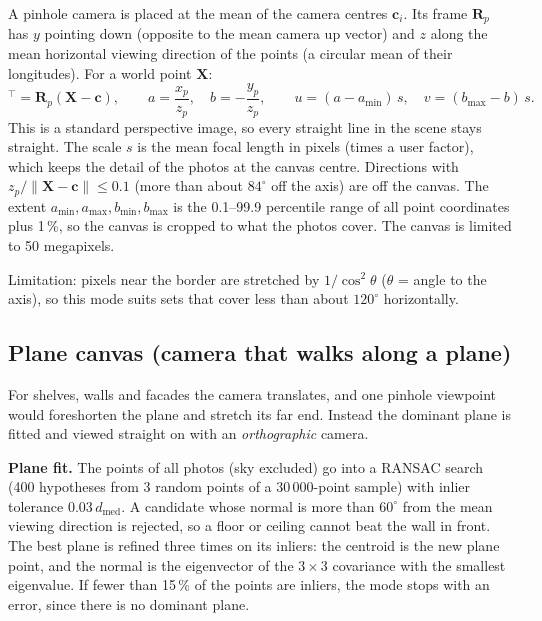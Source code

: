 \documentclass[11pt, a4paper]{article}
\newcommand{\R}{\mathbf{R}}
\newcommand{\X}{\mathbf{X}}
\newcommand{\bc}{\mathbf{c}}
\begin{document}
A pinhole camera is placed at the mean of the camera centres $\bc_i$. Its frame $\R_p$ has $y$ pointing down
(opposite to the mean camera up vector) and $z$ along the mean horizontal viewing direction of the points
(a circular mean of their longitudes). For a world point $\X$:
\begin{equation}
  [x_p, y_p, z_p]^{\top} = \R_p (\X - \bc),
  \qquad a = \frac{x_p}{z_p}, \quad b = -\frac{y_p}{z_p},
  \qquad u = (a - a_{\min})\,s, \quad v = (b_{\max} - b)\,s .
\end{equation}
This is a standard perspective image, so every straight line in the scene stays straight. The scale $s$ is the
mean focal length in pixels (times a user factor), which keeps the detail of the photos at the canvas centre.
Directions with $z_p/\|\X - \bc\| \le 0.1$ (more than about $84^\circ$ off the axis) are off the canvas.
The extent $a_{\min}, a_{\max}, b_{\min}, b_{\max}$ is the 0.1--99.9 percentile range of all point coordinates plus 1\,\%,
so the canvas is cropped to what the photos cover. The canvas is limited to 50 megapixels.

Limitation: pixels near the border are stretched by $1/\cos^2\theta$ ($\theta$ = angle to the axis), so this mode suits
sets that cover less than about $120^\circ$ horizontally.

\subsection{Plane canvas (camera that walks along a plane)}

For shelves, walls and facades the camera translates, and one pinhole viewpoint would foreshorten the plane
and stretch its far end. Instead the dominant plane is fitted and viewed straight on with an \emph{orthographic} camera.

\textbf{Plane fit.} The points of all photos (sky excluded) go into a RANSAC search (400 hypotheses from 3 random points of a
30\,000-point sample) with inlier tolerance $0.03\,d_{\mathrm{med}}$. A candidate whose normal is more than
$60^\circ$ from the mean viewing direction is rejected, so a floor or ceiling cannot beat the wall in front. The best plane is refined
three times on its inliers: the centroid is the new plane point, and the normal is the eigenvector of the
$3\times3$ covariance with the smallest eigenvalue. If fewer than 15\,\% of the points are inliers, the mode stops
with an error, since there is no dominant plane.
\end{document}
